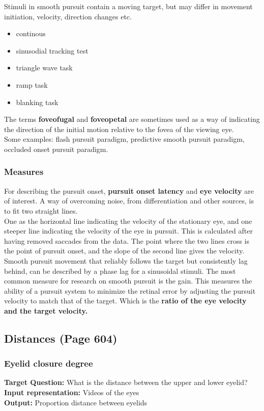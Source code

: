 \documentclass[12pt]{article}
\theoremstyle{definition}
\begin{document}
Stimuli in smooth pursuit contain a moving target, but may differ in movement initiation, velocity, direction changes etc. 

\begin{itemize}
\item continous
\item sinusodial tracking test
\item triangle wave task
\item ramp task 
\item blanking task
\end{itemize}

The terms \textbf{foveofugal} and \textbf{foveopetal} are sometimes used as a way of indicating the direction of the initial motion relative to the fovea of the viewing eye. \\

Some examples: flash pursuit paradigm, predictive smooth pursuit paradigm, occluded onset pursuit paradigm. 
\subsubsection{Measures}
For describing the pursuit onset, \textbf{pursuit onset latency} and \textbf{eye velocity} are of interest. A way of overcoming noise, from differentiation and other sources, is to fit two straight lines.\\

One as the horizontal line indicating the velocity of the stationary eye, and one steeper line indicating the velocity of the eye in pursuit. This is calculated after having removed saccades from the data. The point where the two lines cross is the point of pursuit onset, and the slope of the second line gives the velocity.\\

Smooth pursuit movement that reliably follows the target but consistently lag behind, can be described by a phase lag for a sinusoidal stimuli. The most common measure for research on smooth pursuit is the gain. This measures the ability of a pursuit system to minimize the retinal error by adjusting the pursuit velocity to match that of the target. Which is the \textbf{ratio of the eye velocity and the target velocity.} 




\newpage
\subsection{Distances (Page 604)}
\subsubsection{Eyelid closure degree}
\textbf{Target Question:} What is the distance between the upper and lower eyelid?\\
\textbf{Input representation:} Videos of the eyes\\
\textbf{Output:} Proportion distance between eyelids \\
\end{document}
